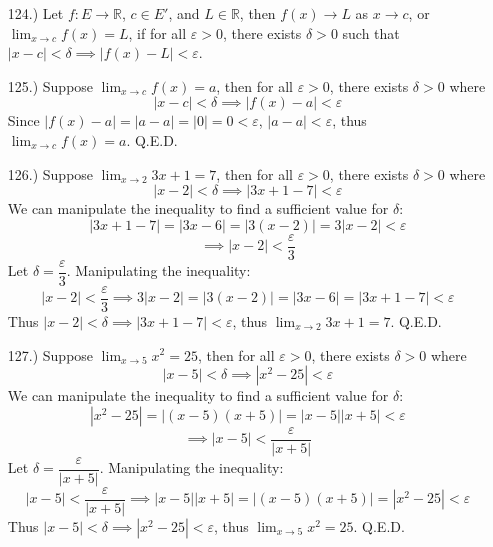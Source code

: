 \documentclass[12pt]{article}
\newcommand{\vertb}[1]{\left\vert#1\right\vert}
\newcommand{\e}{\varepsilon}
\newcommand{\lm}[1]{\displaystyle\lim_{#1}}
\begin{document}
\begin{itemize}






    \item [124.)] Let $f:E\to\mathbb{R}$, $c\in E'$, and $L\in\mathbb{R}$, then $f(x)\to L$ as $x\to c$, or $\displaystyle\lim_{x\to c}f(x)=L$, if for all $\varepsilon>0$, there exists $\delta>0$ such that $\vertb{x-c}<\delta\implies\vertb{f(x)-L}<\varepsilon$.

    \item [125.)] Suppose $\displaystyle\lim_{x\to c}f(x)=a$, then for all $\varepsilon>0$, there exists $\delta>0$ where
    \[\vertb{x-c}<\delta\implies\vertb{f(x)-a}<\varepsilon\]
    Since $\vertb{f(x)-a}=\vertb{a-a}=\vertb{0}=0<\varepsilon$, $\vertb{a-a}<\varepsilon$, thus $\displaystyle\lim_{x\to c}f(x)=a$. Q.E.D.

    \pagebreak
    \item [126.)] Suppose $\lm{x\to2}3x+1=7$, then for all $\varepsilon>0$, there exists $\delta>0$ where
    \[\vertb{x-2}<\delta\implies\vertb{3x+1-7}<\e\]
    We can manipulate the inequality to find a sufficient value for $\delta$:
    \[\vertb{3x+1-7}=\vertb{3x-6}=\vertb{3(x-2)}=3\vertb{x-2}<\e\]
    \[\implies\vertb{x-2}<\frac{\e}{3}\]
    Let $\delta=\dfrac{\e}{3}$. Manipulating the inequality:
    \[\vertb{x-2}<\dfrac{\e}{3}\implies3\vertb{x-2}=\vertb{3(x-2)}=\vertb{3x-6}=\vertb{3x+1-7}<\e\]
    Thus $\vertb{x-2}<\delta\implies\vertb{3x+1-7}<\e$, thus $\lm{x\to2}3x+1=7$. Q.E.D.

    \item [127.)] Suppose $\lm{x\to5}x^2=25$, then for all $\e>0$, there exists $\delta>0$ where
    \[\vertb{x-5}<\delta\implies\vertb{x^2-25}<\e\]
    We can manipulate the inequality to find a sufficient value for $\delta$:
    \[\vertb{x^2-25}=\vertb{(x-5)(x+5)}=\vertb{x-5}\vertb{x+5}<\e\]
    \[\implies\vertb{x-5}<\frac{\e}{\vertb{x+5}}\]
    Let $\delta=\dfrac{\e}{\vertb{x+5}}$. Manipulating the inequality:
    \[\vertb{x-5}<\frac{\varepsilon}{\vertb{x+5}}\implies\vertb{x-5}\vertb{x+5}=\vertb{(x-5)(x+5)}=\vertb{x^2-25}<\e\]
    Thus $\vertb{x-5}<\delta\implies\vertb{x^2-25}<\e$, thus $\lm{x\to5}x^2=25$. Q.E.D.


\end{itemize}
\end{document}

